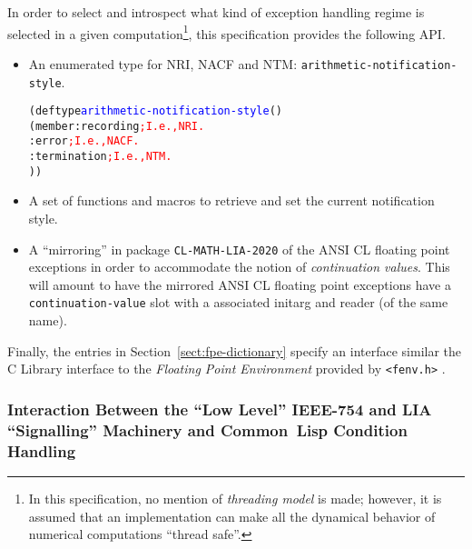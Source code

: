 \documentclass[10pt,fleqn]{article}
\newcommand{\CL}{\textsf{Common~Lisp}}
\newcommand{\CLang}{\textsf{C}}
\newcommand{\code}[1]{\texttt{#1}}
\newcommand{\codelia}[1]{\textcolor{blue}{#1}}
\newcommand{\IEEEFPStd}{IEEE-754}
\newcommand{\CLLIAPKG}{\code{CL-MATH-LIA-2020}}
\begin{document}
In order to select and introspect what kind of exception handling
regime is selected in a given computation\footnote{In this
  specification, no mention of \emph{threading model} is made;
  however, it is assumed that an implementation can make all the
  dynamical behavior of numerical computations ``thread safe''.}, this
specification provides the following API.
\begin{itemize}
\item An enumerated type for NRI, NACF and NTM: %
  \code{arithmetic-notification-style}.
  \begin{alltt}
    (deftype \codelia{arithmetic-notification-style} ()
      (member :recording    \textcolor{red}{; I.e., NRI.}
              :error        \textcolor{red}{; I.e., NACF.}
              :termination  \textcolor{red}{; I.e., NTM.}
              ))
  \end{alltt}
\item A set of functions and macros to retrieve and set the current
  notification style.
\item A ``mirroring'' in package \CLLIAPKG{} of the ANSI CL floating
  point exceptions in order to accommodate the notion of
  \emph{continuation values}.  This will amount to have the mirrored
  ANSI CL floating point exceptions have a \code{continuation-value}
  slot with a associated initarg and reader (of the same name).
\end{itemize}

\vspace*{2mm}

\noindent
Finally, the entries in Section~\ref{sect:fpe-dictionary} specify an interface
similar the \CLang{} Library interface to the \emph{Floating Point
  Environment} provided by \verb|<fenv.h>| \cite{2018:C18}.


\subsubsection{Interaction Between the ``Low Level'' \IEEEFPStd{} and LIA
  ``Signalling'' Machinery and \CL{} Condition Handling}
\end{document}
